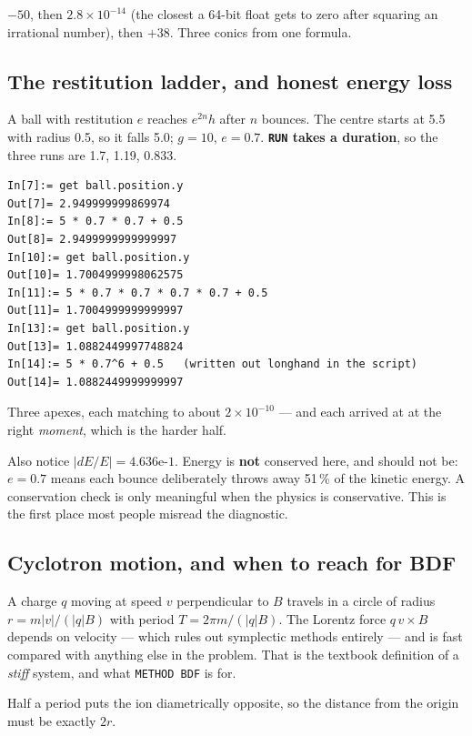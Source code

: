 \documentclass[11pt]{article}
\newcommand{\kw}[1]{\texttt{\uppercase{#1}}}
\begin{document}
$-50$, then $2.8\times10^{-14}$ (the closest a 64-bit float gets to zero
after squaring an irrational number), then $+38$. Three conics from one
formula.

\subsection{The restitution ladder, and honest energy loss}

A ball with restitution $e$ reaches $e^{2n}h$ after $n$ bounces. The
centre starts at 5.5 with radius 0.5, so it falls 5.0; $g=10$, $e=0.7$.
\textbf{\kw{run} takes a duration}, so the three runs are 1.7, 1.19,
0.833.

\begin{lstlisting}
In[7]:= get ball.position.y
Out[7]= 2.949999999869974
In[8]:= 5 * 0.7 * 0.7 + 0.5
Out[8]= 2.9499999999999997
In[10]:= get ball.position.y
Out[10]= 1.7004999998062575
In[11]:= 5 * 0.7 * 0.7 * 0.7 * 0.7 + 0.5
Out[11]= 1.7004999999999997
In[13]:= get ball.position.y
Out[13]= 1.0882449997748824
In[14]:= 5 * 0.7^6 + 0.5   (written out longhand in the script)
Out[14]= 1.0882449999999997
\end{lstlisting}

Three apexes, each matching to about $2\times10^{-10}$ --- and each
arrived at at the right \emph{moment}, which is the harder half.

Also notice $|dE/E| = 4.636\text{e-}1$. Energy is \textbf{not} conserved
here, and should not be: $e=0.7$ means each bounce deliberately throws
away 51\,\% of the kinetic energy. A conservation check is only
meaningful when the physics is conservative. This is the first place
most people misread the diagnostic.

\subsection{Cyclotron motion, and when to reach for BDF}

A charge $q$ moving at speed $v$ perpendicular to $B$ travels in a
circle of radius $r = m|v|/(|q|B)$ with period $T = 2\pi m/(|q|B)$. The
Lorentz force $q\,v\times B$ depends on velocity --- which rules out
symplectic methods entirely --- and is fast compared with anything else
in the problem. That is the textbook definition of a \emph{stiff}
system, and what \kw{method bdf} is for.

Half a period puts the ion diametrically opposite, so the distance from
the origin must be exactly $2r$.
\end{document}
